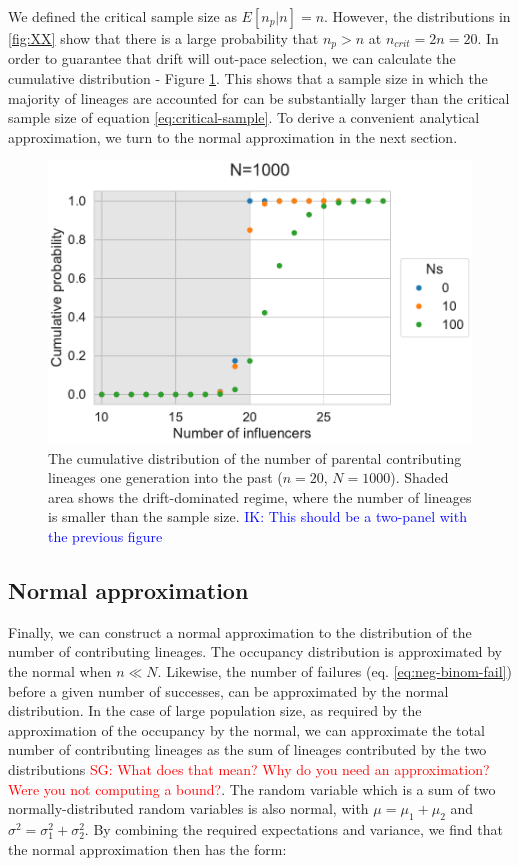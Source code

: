 \documentclass[review]{elsarticle}
\newcommand{\sgcomment}[1]{\textcolor{red}{SG: #1}}
\newcommand{\ikcomment}[1]{\textcolor{blue}{IK: #1}}
\begin{document}
We defined the critical sample size as $E[n_p | n] = n$. However, the distributions in \ref{fig:XX}
show that there is a large probability that $n_p>n$ at $n_{crit}=2n=20$. In order to guarantee that
drift will out-pace selection, we can calculate the cumulative distribution - Figure
\ref{fig:cumulative-dist}. This shows that a sample size in which the majority of lineages are
accounted for can be substantially larger than the critical sample size of equation
\eqref{eq:critical-sample}. To derive a convenient analytical approximation, we turn to the normal
approximation in the next section.

\begin{figure}
  \centering
  \includegraphics[]{fig/cumulative-dist.pdf}
   \caption{The cumulative distribution of the number of parental contributing lineages one generation into the
    past ($n=20$, $N=1000$). Shaded area shows the drift-dominated regime, where the number of
    lineages is smaller than the sample size. \ikcomment{This should be a two-panel with the
      previous figure}}
  \label{fig:cumulative-dist}
\end{figure}

\subsection{Normal approximation}

Finally, we can construct a normal approximation to the distribution of the number of contributing
lineages. The occupancy distribution is approximated by the normal \citep{ONeill2019} when $n \ll N$.
Likewise, the number of failures (eq. \eqref{eq:neg-binom-fail}) before a given number of successes,
can be approximated by the normal distribution. In the case of large population size, as required by
the approximation of the occupancy by the normal, we can approximate the total number of
contributing lineages as the sum of lineages contributed by the two distributions \sgcomment{What does that mean? Why do you need an approximation? Were you not computing a bound?}. The random
variable which is a sum of two normally-distributed random variables is also normal, with
$\mu=\mu_1+\mu_2$ and $\sigma^2 = \sigma^2_1 + \sigma^2_2$. By combining the required expectations
and variance, we find that the normal approximation then has the form:
\end{document}
